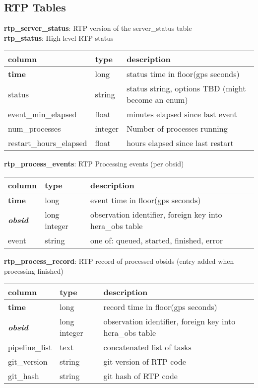 \documentclass{article}
\begin{document}
\subsection{RTP Tables}
\textbf{\large{rtp\_server\_status}}: RTP version of the server\_status table\\

\textbf{\large{rtp\_status}}: High level RTP status
\begin{center}
 \begin{tabular}{| p{4cm} | p{2cm} | p{10cm} |} 
\hline
 column & type & description \\ [0.5ex]  \hline\hline
\textbf{time} & long & status time in floor(gps seconds)\\ \hline
status & string & status string, options TBD (might become an enum) \\\hline
event\_min\_elapsed & float & minutes elapsed since last event \\\hline
num\_processes & integer & Number of processes running  \\\hline
restart\_hours\_elapsed & float & hours elapsed since last restart \\\hline
\end{tabular}
\end{center}

\textbf{\large{rtp\_process\_events}}: RTP Processing events (per obsid)
\begin{center}
 \begin{tabular}{| p{4cm} | p{2cm} | p{10cm} |} 
\hline
 column & type & description \\ [0.5ex]  \hline\hline
\textbf{time} & long & event time in floor(gps seconds) \\ \hline
\textit{\textbf{obsid}} & long integer & observation identifier, foreign key into hera\_obs table \\ \hline
event & string & one of: queued, started, finished, error  \\\hline
\end{tabular}
\end{center}

\textbf{\large{rtp\_process\_record}}: RTP record of processed obsids (entry added when processing finished)
\begin{center}
 \begin{tabular}{| p{4cm} | p{2cm} | p{10cm} |} 
\hline
 column & type & description \\ [0.5ex]  \hline\hline
\textbf{time} & long & record time in floor(gps seconds)\\ \hline
\textit{\textbf{obsid}} & long integer & observation identifier, foreign key into hera\_obs table \\ \hline
pipeline\_list & text & concatenated list of tasks  \\\hline
git\_version & string & git version of RTP code  \\\hline
git\_hash & string & git hash of RTP code  \\\hline
\end{tabular}
\end{center}
\end{document}
